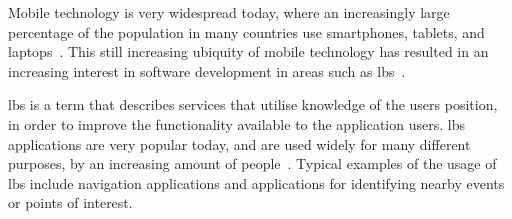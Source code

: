 Mobile technology is very widespread today, where an increasingly large percentage of the population in many countries use smartphones, tablets, and laptops~\cite{techcrunch_mobile_usage}. This still increasing ubiquity of mobile technology has resulted in an increasing interest in software development in areas such as \gls{lbs}~\cite{dey2010location}. 

\gls{lbs} is a term that describes services that utilise knowledge of the users position, in order to improve the functionality available to the application users. \gls{lbs} applications are very popular today, and are used widely for many different purposes, by an increasing amount of people~\cite[pp. 1-2]{schiller2004location}. Typical examples of the usage of \gls{lbs} include navigation applications and applications for identifying nearby events or points of interest.


